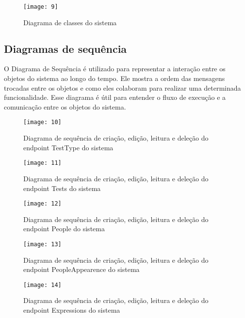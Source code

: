 \begin{figure}[h]
  \caption{Diagrama de classes do sistema}
  \centering
  \texttt{[image: 9]}
  \label{fig:9}
\end{figure}
\FloatBarrier

\clearpage
\subsection{Diagramas de sequência}

O Diagrama de Sequência \cite{28} é utilizado para representar a interação entre os objetos do sistema ao longo do tempo. Ele mostra a ordem das mensagens trocadas entre os objetos e como eles colaboram para realizar uma determinada funcionalidade. Esse diagrama é útil para entender o fluxo de execução e a comunicação entre os objetos do sistema.

\begin{figure}[h]
  \caption{Diagrama de sequência de criação, edição, leitura e deleção do endpoint TestType do sistema}
  \centering
  \texttt{[image: 10]}
  \label{fig:10}
\end{figure}
\FloatBarrier

\begin{figure}[h]
  \caption{Diagrama de sequência de criação, edição, leitura e deleção do endpoint Tests do sistema}
  \centering
  \texttt{[image: 11]}
  \label{fig:11}
\end{figure}
\FloatBarrier

\begin{figure}[h]
  \caption{Diagrama de sequência de criação, edição, leitura e deleção do endpoint People do sistema}
  \centering
  \texttt{[image: 12]}
  \label{fig:12}
\end{figure}
\FloatBarrier

\begin{figure}[h]
  \caption{Diagrama de sequência de criação, edição, leitura e deleção do endpoint PeopleAppearence do sistema}
  \centering
  \texttt{[image: 13]}
  \label{fig:13}
\end{figure}
\FloatBarrier

\begin{figure}[h]
  \caption{Diagrama de sequência de criação, edição, leitura e deleção do endpoint Expressions do sistema}
  \centering
  \texttt{[image: 14]}
  \label{fig:14}
\end{figure}
\FloatBarrier

